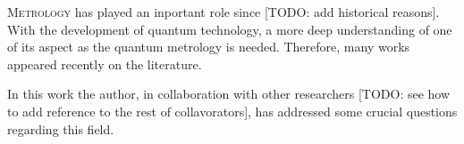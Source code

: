 
\lettrine[lines=2, findent=3pt,nindent=0pt]{M}{etrology} has played an inportant role since [TODO: add historical reasons]. With the development of quantum technology, a more deep understanding of one of its aspect as the quantum metrology is needed. Therefore, many works appeared recently on the literature. 

In this work the author, in collaboration with other researchers [TODO: see how to add reference to the rest of collavorators], has addressed some crucial questions regarding this field. 